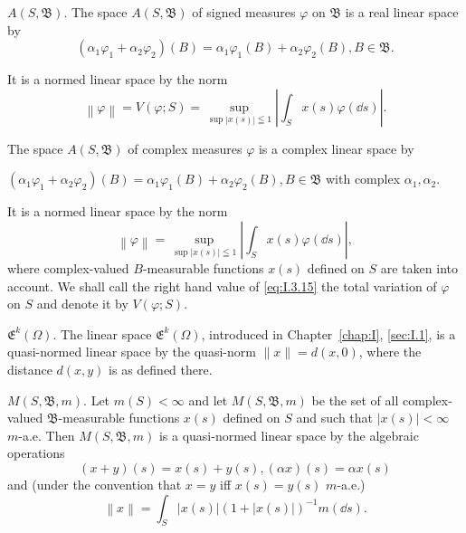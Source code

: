 \begin{example}\label{ex:I.3.Example.5} $A(S, \mathfrak{B})$. The space $A(S, \mathfrak{B})$ of signed measures $\varphi$ on $\mathfrak{B}$ is a real linear space by 
\[
\left(\alpha_{1} \varphi_{1} + \alpha_{2} \varphi_{2}\right) (B) = \alpha_{1} \varphi_{1} (B) + \alpha_{2} \varphi_{2} (B), B \in \mathfrak {B}.
\]
\end{example}

It is a normed linear space by the norm 
\begin{equation}\label{eq:I.3.14}
\left\| \varphi \right\| = V (\varphi ; S) = \sup\limits_{\sup| x (s) | \leqq 1} \left| \int_{S} x (s) \varphi (\dd s) \right|.
\end{equation}

\begin{example}\label{ex:I.3.Example.6} The space $A(S, \mathfrak{B})$ of complex measures $\varphi$ is a complex linear space by 

$(\alpha_{1}\varphi_{1} + \alpha_{2}\varphi_{2})(B) = \alpha_{1}\varphi_{1}(B) + \alpha_{2}\varphi_{2}(B), B \in \mathfrak{B}$ with complex $\alpha_{1}, \alpha_{2}$. 
\end{example}

It is a normed linear space by the norm 
\begin{equation}\label{eq:I.3.15}
\left\| \varphi \right\| = \sup\limits_{\sup| x (s) | \leqq 1} \left| \int_{S} x (s) \varphi (\dd s) \right|,
\end{equation}
where complex-valued $B$-measurable functions $x(s)$ defined on $S$ are taken into account. We shall call the right hand value of \eqref{eq:I.3.15} the total variation of $\varphi$ on $S$ and denote it by $V(\varphi; S)$. 


\label{sec:I.4}

\begin{example}\label{ex:I.4.Example.1} $\mathfrak{E}^k (\Omega)$. The linear space $\mathfrak{E}^k (\Omega)$, introduced in Chapter~\ref{chap:I}, \ref{sec:I.1}, is a quasi-normed linear space by the quasi-norm $\|x\| = d(x,0)$, where the distance $d(x,y)$ is as defined there. 
\end{example}

\begin{example}\label{ex:I.4.Example.2} $M(S, \mathfrak{B}, m)$. Let $m(S) < \infty$ and let $M(S, \mathfrak{B}, m)$ be the set of all complex-valued $\mathfrak{B}$-measurable functions $x(s)$ defined on $S$ and such that $|x(s)| < \infty$ $m$-a.e. Then $M(S, \mathfrak{B}, m)$ is a quasi-normed linear space by the algebraic operations 
\[
(x + y) (s) = x (s) + y (s), (\alpha x) (s) = \alpha x (s)
\]
and (under the convention that $x = y$ iff $x(s) = y(s)$ $m$-a.e.) 
\begin{equation}\label{eq:I.4.1}
\left\| x \right\| = \int_{S} | x (s) | (1 + | x (s) |) ^{-1} m (\dd s).
\end{equation}
\end{example}

